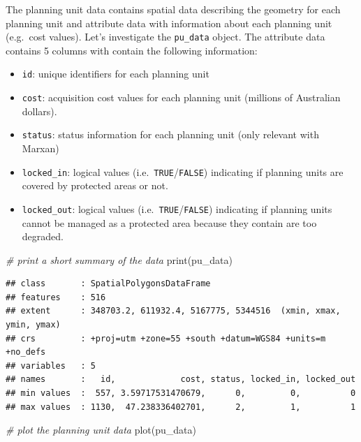 \documentclass[
  12pt,
]{book}
\newenvironment{Shaded}{\begin{snugshade}}{\end{snugshade}}
\newcommand{\CommentTok}[1]{\textcolor[rgb]{0.56,0.35,0.01}{\textit{#1}}}
\newcommand{\FunctionTok}[1]{\textcolor[rgb]{0.00,0.00,0.00}{#1}}
\newcommand{\NormalTok}[1]{#1}
\providecommand{\tightlist}{%
  \setlength{\itemsep}{0pt}\setlength{\parskip}{0pt}}
\begin{document}
The planning unit data contains spatial data describing the geometry for each planning unit and attribute data with information about each planning unit (e.g.~cost values). Let's investigate the \texttt{pu\_data} object. The attribute data contains 5 columns with contain the following information:

\begin{itemize}
\tightlist
\item
  \texttt{id}: unique identifiers for each planning unit
\item
  \texttt{cost}: acquisition cost values for each planning unit (millions of Australian dollars).
\item
  \texttt{status}: status information for each planning unit (only relevant with Marxan)
\item
  \texttt{locked\_in}: logical values (i.e.~\texttt{TRUE}/\texttt{FALSE}) indicating if planning units are covered by protected areas or not.
\item
  \texttt{locked\_out}: logical values (i.e.~\texttt{TRUE}/\texttt{FALSE}) indicating if planning units cannot be managed as a protected area because they contain are too degraded.
\end{itemize}

\begin{Shaded}
\begin{Highlighting}[]
\CommentTok{\# print a short summary of the data}
\FunctionTok{print}\NormalTok{(pu\_data)}
\end{Highlighting}
\end{Shaded}

\begin{verbatim}
## class       : SpatialPolygonsDataFrame 
## features    : 516 
## extent      : 348703.2, 611932.4, 5167775, 5344516  (xmin, xmax, ymin, ymax)
## crs         : +proj=utm +zone=55 +south +datum=WGS84 +units=m +no_defs 
## variables   : 5
## names       :   id,             cost, status, locked_in, locked_out 
## min values  :  557, 3.59717531470679,      0,         0,          0 
## max values  : 1130,  47.238336402701,      2,         1,          1
\end{verbatim}

\begin{Shaded}
\begin{Highlighting}[]
\CommentTok{\# plot the planning unit data}
\FunctionTok{plot}\NormalTok{(pu\_data)}
\end{Highlighting}
\end{Shaded}
\end{document}
